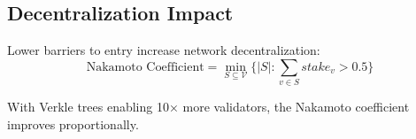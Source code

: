 \subsection{Decentralization Impact}

Lower barriers to entry increase network decentralization:
\begin{equation}
    \text{Nakamoto Coefficient} = \min_{S \subseteq \mathcal{V}} \{|S| : \sum_{v \in S} stake_v > 0.5\}
\end{equation}

With Verkle trees enabling 10× more validators, the Nakamoto coefficient improves proportionally.

